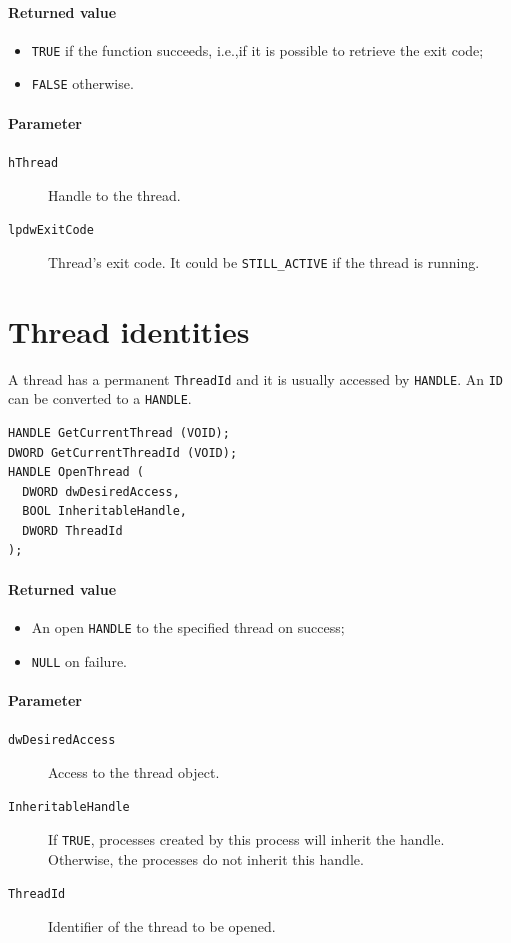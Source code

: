 \paragraph{Returned value}
\begin{itemize}
\item \texttt{TRUE} if the function succeeds, i.e.,\@ if it is possible to retrieve the exit code;
\item \texttt{FALSE} otherwise.
\end{itemize}

\paragraph{Parameter}
\begin{description}
\item [\texttt{hThread}] Handle to the thread.
\item [\texttt{lpdwExitCode}] Thread's exit code. It could be \texttt{STILL\_ACTIVE} if the thread is running.
\end{description}

\section{Thread identities}
A thread has a permanent \texttt{ThreadId} and it is usually accessed by \texttt{HANDLE}. An \texttt{ID} can be converted to a \texttt{HANDLE}.

\begin{verbatim}
HANDLE GetCurrentThread (VOID);
DWORD GetCurrentThreadId (VOID);
HANDLE OpenThread (
  DWORD dwDesiredAccess,
  BOOL InheritableHandle,
  DWORD ThreadId
);
\end{verbatim}

\paragraph{Returned value}
\begin{itemize}
\item An open \texttt{HANDLE} to the specified thread on success;
\item \texttt{NULL} on failure.
\end{itemize}

\paragraph{Parameter}
\begin{description}
\item [\texttt{dwDesiredAccess}] Access to the thread object.
\item [\texttt{InheritableHandle}] If \texttt{TRUE}, processes created by this process will inherit the handle. Otherwise, the processes do not inherit this handle.
\item [\texttt{ThreadId}] Identifier of the thread to be opened.
\end{description}

